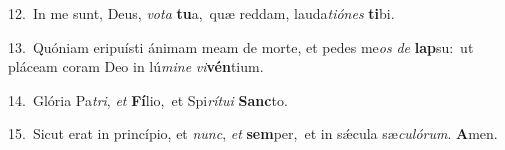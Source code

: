 {\numbfont\textcolor{\numbcolor}{12.}}~In me sunt, Deus, \textit{vo}\-\textit{ta} \textbf{tu}\-a,~\star quæ reddam, lauda\-\textit{ti}\-\textit{ó}\textit{nes} \textbf{ti}\-bi.\par
{\numbfont\textcolor{\numbcolor}{13.}}~Quóniam eripuísti ánimam meam de morte, et pedes me\textit{os} \textit{de} \textbf{lap}\-su:~\star ut pláceam coram Deo in lú\-\textit{mi}\-\textit{ne} \textit{vi}\-\textbf{vén}tium.\par
{\numbfont\textcolor{\numbcolor}{14.}}~Glória Pa\-\textit{tri}\-, \textit{et} \textbf{Fí}\-lio,~\star et Spi\-\textit{rí}\-\textit{tu}\textit{i} \textbf{Sanc}\-to.\par
{\numbfont\textcolor{\numbcolor}{15.}}~Sicut erat in princípio, et \textit{nunc}\-, \textit{et} \textbf{sem}\-per,~\star et in sǽcula sæ\-\textit{cu}\-\textit{ló}\textit{rum}. \textbf{A}\-men.\par

